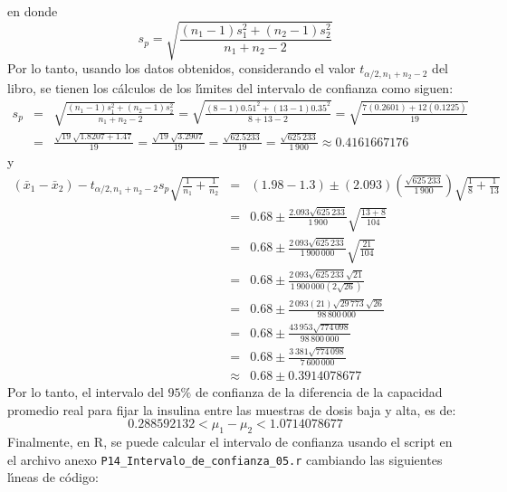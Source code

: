 \begin{solucion}
\begin{equation*}
 \end{equation*}
 en donde
 \begin{equation*}
  s_p = \sqrt{\frac{\left( n_1 - 1 \right)s_1^2 + \left( n_2 - 1 \right)s_2^2}{n_1 + n_2 - 2}}
 \end{equation*}
 Por lo tanto, usando los datos obtenidos, considerando el valor $t_{\alpha/2,n_1+n_2-2}$ del libro, se tienen los c\'alculos de los l\'{\i}mites del intervalo de confianza como siguen:
 \begin{eqnarray*}
  s_p & = & \sqrt{\frac{\left( n_1 - 1 \right)s_1^2 + \left( n_2 - 1 \right)s_2^2}{n_1 + n_2 - 2}} = \sqrt{\frac{(8-1)0.51^2 + (13-1)0.35^2}{8+13-2}} = \sqrt{\frac{7(0.2601)+ 12(0.1225)}{19}} \\
  & = & \frac{\sqrt{19}\sqrt{1.8207 + 1.47}}{19} = \frac{\sqrt{19}\sqrt{3.2907}}{19} = \frac{\sqrt{62.5233}}{19} = \frac{\sqrt{625\,233}}{1\,900} \approx 0.4161667176
 \end{eqnarray*}
 y
 \begin{eqnarray*}
  \left( \bar{x}_1 - \bar{x}_2 \right) - t_{\alpha/2,n_1+n_2-2} s_p \sqrt{\frac{1}{n_1} + \frac{1}{n_2}} & = & (1.98 - 1.3) \pm (2.093)\left( \frac{\sqrt{625\,233}}{1\,900} \right) \sqrt{\frac{1}{8} + \frac{1}{13}} \\
   & = & 0.68 \pm \frac{2.093\sqrt{625\,233}}{1\,900} \sqrt{\frac{13+8}{104}} \\
   & = & 0.68 \pm \frac{2\,093\sqrt{625\,233}}{1\,900\,000} \sqrt{\frac{21}{104}} \\
   & = & 0.68 \pm \frac{2\,093\sqrt{625\,233}\sqrt{21}}{1\,900\,000\left( 2\sqrt{26} \right)} \\
   & = & 0.68 \pm \frac{2\,093 (21)\sqrt{29\,773}\sqrt{26}}{98\,800\,000} \\
   & = & 0.68 \pm \frac{43\,953\sqrt{774\,098}}{98\,800\,000} \\
   & = & 0.68 \pm \frac{3\,381\sqrt{774\,098}}{7\,600\,000} \\
   & \approx & 0.68 \pm 0.3914078677
 \end{eqnarray*}
 Por lo tanto, el intervalo del $95\%$ de confianza de la diferencia de la capacidad promedio real para fijar la insulina entre las muestras de dosis baja y alta, es de:
 \begin{equation*}
  0.288592132 < \mu_1 - \mu_2 < 1.0714078677
 \end{equation*}
 Finalmente, en R, se puede calcular el intervalo de confianza usando el script en el archivo anexo \texttt{P14\_Intervalo\_de\_confianza\_05.r} cambiando las siguientes l\'{\i}neas de c\'odigo:

\end{solucion}

